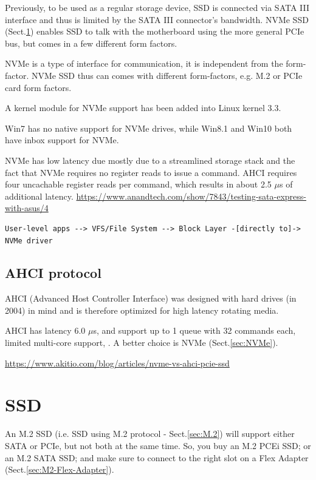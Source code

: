 Previously, to be used as a regular storage device, SSD is connected via SATA
III interface and thus is limited by the SATA III connector's bandwidth. NVMe
SSD (Sect.\ref{sec:SSD}) enables SSD to talk with the motherboard using the more
general PCIe bus, but comes in a few different form factors.

NVMe is a type of interface for communication, it is independent from the
form-factor. NVMe SSD thus can comes with different form-factors, e.g.  M.2 or
PCIe card form factors.

A kernel module for NVMe support has been added into Linux kernel 3.3.

Win7 has no native support for NVMe drives, while Win8.1 and Win10 both have
inbox support for NVMe.

NVMe has low latency due mostly due to a streamlined storage stack and the fact
that NVMe requires no register reads to issue a command. AHCI requires four
uncachable register reads per command, which results in about 2.5 $\mu$s of
additional latency.
\url{https://www.anandtech.com/show/7843/testing-sata-express-with-asus/4}

\begin{verbatim}
User-level apps --> VFS/File System --> Block Layer -[directly to]->  NVMe driver
\end{verbatim}



\subsection{AHCI protocol}
\label{sec:AHCI}

AHCI (Advanced Host Controller Interface) was designed with hard drives (in
2004) in mind and is therefore optimized for high latency rotating media.

AHCI has latency 6.0 $\mu$s, and support up to 1 queue with
32 commands each, limited multi-core support, .
A better choice is NVMe (Sect.\ref{sec:NVMe}).


\url{https://www.akitio.com/blog/articles/nvme-vs-ahci-pcie-ssd}

\section{SSD}
\label{sec:SSD}

An M.2 SSD (i.e. SSD using M.2 protocol - Sect.\ref{sec:M.2}) will support
either SATA or PCIe, but not both at the same time.
So, you buy an M.2 PCEi SSD; or an M.2 SATA SSD; and make sure to connect to the
right slot on a Flex Adapter (Sect.\ref{sec:M2-Flex-Adapter}).

